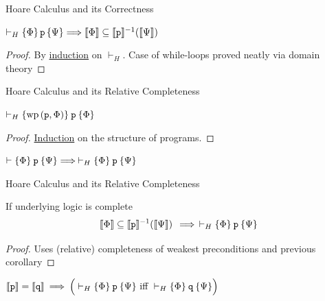\documentclass{beamer}
\begin{document}
\begin{frame}{Hoare Calculus and its Correctness} 

        \begin{theorem}[Soundness]
                $\vdash_H \{ \Phi \} \, \mathtt{p} \, \{ \Psi \}
                \Longrightarrow
                \llbracket \Phi \rrbracket \subseteq \llbracket \mathtt{p} \rrbracket^{-1}(\llbracket \Psi \rrbracket)$
        \end{theorem}

        \begin{proof}
                By \alert{\underline{induction}} on $\vdash_H$. Case of
                while-loops proved neatly via domain theory
        \end{proof}

\end{frame}

\begin{frame}{Hoare Calculus and its Relative Completeness}

        \begin{lemma}
                $\vdash_H \{ \mathrm{wp} \, (\mathtt{p}, \Phi) \} \>
                \mathtt{p} \> \{ \Phi \} $
        \end{lemma}

        \begin{proof}
                \alert{\underline{Induction}} on the structure of programs.
        \end{proof}

        \medskip
        \begin{corollary}
                $\vdash \{ \Phi \} \> \mathtt{p} \> \{ \Psi \}
                \Longrightarrow \> \vdash_H \{ \Phi \} \> \mathtt{p} \> \{ \Psi \}$
        \end{corollary}

\end{frame}

\begin{frame}{Hoare Calculus and its Relative Completeness}
        \begin{theorem}
        If underlying logic is complete
        \[
                \llbracket \Phi \rrbracket \subseteq \llbracket \mathtt{p} \rrbracket^{-1} (\llbracket \Psi \rrbracket)
                \> \> \Longrightarrow \> \>
                \vdash_H \{ \Phi \} \> \mathtt{p} \> \{ \Psi \}
        \]
        \end{theorem}

        \begin{proof}
                Uses (relative) completeness of weakest preconditions and previous corollary
        \end{proof}

        \medskip
        \begin{corollary}
                $\llbracket \mathtt{p} \rrbracket = \llbracket \mathtt{q} \rrbracket
                \>  \Longrightarrow  \> 
                \Big ( \vdash_H \{ \Phi \} \> \mathtt{p} \>  \{ \Psi \} \text{ iff }
                \vdash_H \{ \Phi \} \> \mathtt{q} \> \{ \Psi \} \Big )$
        \end{corollary}
\end{frame}
\end{document}
